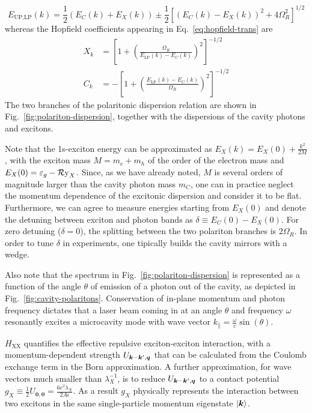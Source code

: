 % 
\begin{equation}\label{eq:polariton-dispersion}
  E_{\text{UP,LP}}(k) = \frac{1}{2}\left(E_C(k) + E_X(k)\right) \pm \frac{1}{2}\left[\left(E_C(k) - E_X(k)\right)^2 + 4 \Omega_R^2\right]^{1/2}
\end{equation}
% 
whereas the Hopfield coefficients appearing in Eq.~\eqref{eq:hopfield-trans} are
\begin{align}
  X_k & =\left[1 + \left(\frac{\Omega_R}{E_{\text{LP}}(k) - E_C(k)}\right)^2\right]^{-1/2}\label{eq:hopfield-X}\\
  C_k & =-\left[1 + \left(\frac{E_{\text{LP}}(k) - E_C(k)}{\Omega_R}\right)^2\right]^{-1/2}
\end{align}
The two branches of the polaritonic dispersion relation are shown in
Fig.~\ref{fig:polariton-dispersion}, together with the dispersions of
the cavity photons and excitons.

Note that the 1s-exciton energy can be approximated as
$E_X(k) = E_X(0) + \frac{k^2}{2M}$, with the exciton mass
$M = m_e + m_h$ of the order of the electron mass and
$E_X(0) = \varepsilon_g - \operatorname{\mathcal{R}y}_X$. Since, as we have already noted, $M$
is several orders of magnitude larger than the cavity photon mass
$m_{C}$, one can in practice neglect the momentum dependence
of the excitonic dispersion and consider it to be flat. Furthermore,
we can agree to measure energies starting from $E_X(0)$ and denote the
detuning between exciton and photon bands as
$\delta \equiv E_C(0) - E_X(0)$. For zero detuning ($\delta = 0$), the
splitting between the two polariton branches is $2\Omega_R$. In order
to tune $\delta$ in experiments, one tipically builds the cavity
mirrors with a wedge.

Also note that the spectrum in Fig.~\ref{fig:polariton-dispersion} is
represented as a function of the angle $\theta$ of emission of a
photon out of the cavity, as depicted in
Fig.~\ref{fig:cavity-polaritons}. Conservation of in-plane momentum
and photon frequency dictates that a laser beam coming in at an angle
$\theta$ and frequency $\omega$ resonantly excites a microcavity mode
with wave vector $k_{\parallel} = \frac{\omega}{c}\sin(\theta)$.

$H_{\text{XX}}$ quantifies the effective repulsive exciton-exciton
interaction, with a momentum-dependent strength
$U_{\bm{k} - \bm{k}^{\prime},\bm{q}}$ that can be calculated from the
Coulomb exchange term in the Born approximation. A further
approximation, for wave vectors much smaller than $\lambda_X^{-1}$, is
to reduce $U_{\bm{k} - \bm{k}^{\prime},\bm{q}}$ to a contact potential
$g_X \equiv \frac{1}{2} U_{\bm{0},\bm{0}} =
\frac{6e^2\lambda_X}{2A\epsilon}$. As a result $g_X$ physically
represents the interaction between two excitons in the same
single-particle momentum eigenstate $\vert \bm{k} \rangle$.


